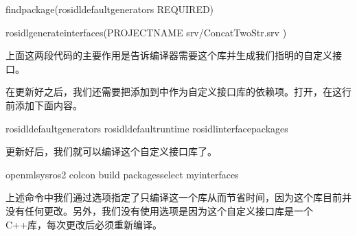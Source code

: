 \documentclass[letterpaper,10pt,english]{sphinxmanual}
\begin{document}
\begin{sphinxVerbatim}[commandchars=\\\{\}]
find\PYGZus{}package(rosidl\PYGZus{}default\PYGZus{}generators REQUIRED)

rosidl\PYGZus{}generate\PYGZus{}interfaces(\PYGZdl{}\PYGZob{}PROJECT\PYGZus{}NAME\PYGZcb{}
  \PYGZdq{}srv/ConcatTwoStr.srv\PYGZdq{}
)
\end{sphinxVerbatim}

\sphinxAtStartPar
上面这两段代码的主要作用是告诉编译器需要这个库并生成我们指明的自定义接口。

\sphinxAtStartPar
在更新好之后，我们还需要把添加到中作为自定义接口库的依赖项。打开，在这行前添加下面内容。

\begin{sphinxVerbatim}[commandchars=\\\{\}]
rosidl\PYGZus{}default\PYGZus{}generators
rosidl\PYGZus{}default\PYGZus{}runtime
rosidl\PYGZus{}interface\PYGZus{}packages
\end{sphinxVerbatim}

\sphinxAtStartPar
更新好后，我们就可以编译这个自定义接口库了。

\begin{sphinxVerbatim}[commandchars=\\\{\}]
 openmlsys\PYGZhy{}ros2
colcon build \PYGZhy{}\PYGZhy{}packages\PYGZhy{}select my\PYGZus{}interfaces
\end{sphinxVerbatim}

\sphinxAtStartPar
上述命令中我们通过选项指定了只编译这一个库从而节省时间，因为这个库目前并没有任何更改。另外，我们没有使用选项是因为这个自定义接口库是一个C++库，每次更改后必须重新编译。
\end{document}
